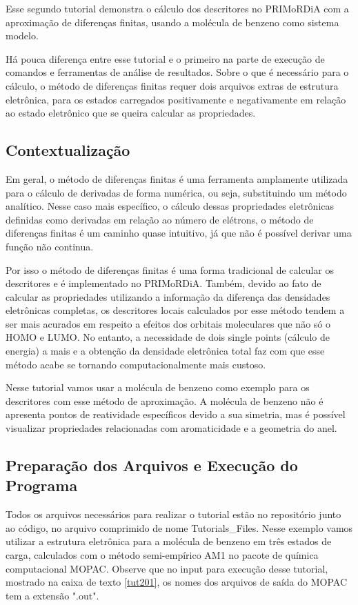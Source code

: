 \documentclass[a4paper,11pt]{refart}
\begin{document}
Esse segundo tutorial demonstra o cálculo dos descritores no PRIMoRDiA com a aproximação de diferenças finitas, usando a molécula de benzeno como sistema modelo.  

Há pouca diferença entre esse tutorial e o primeiro na parte de execução de comandos e ferramentas de análise de resultados. Sobre o que é necessário para o cálculo, o método de diferenças finitas requer dois arquivos extras de estrutura eletrônica, para os estados carregados positivamente e negativamente em relação ao estado eletrônico que se queira calcular as propriedades. 


\subsection{Contextualização}

Em geral, o método de diferenças finitas é uma ferramenta amplamente utilizada para o cálculo de derivadas de forma numérica, ou seja, substituindo um método analítico. Nesse caso mais específico, o cálculo dessas propriedades eletrônicas definidas como derivadas em relação ao número de elétrons, o método de diferenças finitas é um caminho quase intuitivo, já que não é possível derivar uma função não continua. 

Por isso o método de diferenças finitas é uma forma tradicional de calcular os descritores e é implementado no PRIMoRDiA. Também, devido ao fato de calcular as propriedades utilizando a informação da diferença das densidades eletrônicas completas, os descritores locais calculados por esse método tendem a ser mais acurados em respeito a efeitos dos orbitais moleculares que não só o HOMO e LUMO. No entanto, a necessidade de dois single points (cálculo de energia) a mais e a obtenção da densidade eletrônica total faz com que esse método acabe se tornando computacionalmente mais custoso. 

Nesse tutorial vamos usar a molécula de benzeno como exemplo para os descritores com esse método de aproximação. A molécula de benzeno não é apresenta pontos de reatividade específicos devido a sua simetria, mas é possível visualizar propriedades relacionadas com aromaticidade e a geometria do anel. 

\subsection{Preparação dos Arquivos e Execução do Programa}

Todos os arquivos necessários para realizar o tutorial estão no repositório junto ao código, no arquivo comprimido de nome Tutorials\_Files. Nesse exemplo vamos utilizar a estrutura eletrônica para a molécula de benzeno em três estados de carga, calculados com o método semi-empírico AM1 no pacote de química computacional MOPAC. Observe que no input para execução desse tutorial, mostrado na caixa de texto \autoref{tut201}, os nomes dos arquivos de saída do MOPAC tem a extensão ".out". 
\end{document}
